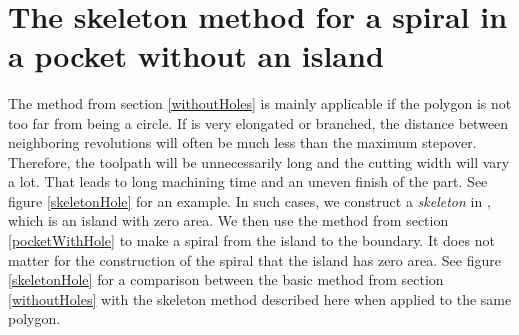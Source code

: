 \documentclass[3p]{elsarticle}
\begin{document}
\begin{figure*}
\centering
{}\\
\quad
{}
\caption{
The same pocket and island as in figure \ref{holeWavefronts}.
The cycle  is blue, the other edges of  are gray.
The interpolated spiral is black, and we have not introduced extra spiral corners on
 to avoid self-intersections.
In order to emphasize the intersection problems that can arise,
we have not used the method described in \ref{appB},
but merely used the preferred time and speed of each node (section \ref{defMovement}).
 is a close-up of 
of the area in the red rectangle. In , we have introduced new corners on
 when the spiral jumps from one side of  to the other when the union of the two
faces on each side of  is not convex.
}
\label{repairCrossings}
\end{figure*}

\section{The skeleton method for a spiral in a pocket without an island}\label{skeletonMethod}

\begin{figure*}
\centering
{}\quad
{}
\caption{
Comparison of the basic spiral method from section \ref{withoutHoles}, figure ,
with the improved skeleton method from section \ref{skeletonMethod}, figure .
Note that the spiral obtained from the skeleton method is significantly shorter and that the distance between
neighboring revolutions is varying much less than when using the basic method.
}
\label{skeletonHole}
\end{figure*}

The method from section \ref{withoutHoles} is mainly applicable
if the polygon  is not too far from being a circle. If  is very elongated or branched,
the distance between neighboring revolutions will often be much less
than the maximum stepover. Therefore, the toolpath will be unnecessarily long and the cutting width will
vary a lot. That leads to long machining time and an uneven finish of the part.
See figure \ref{skeletonHole} for an example.
In such cases, we construct a \emph{skeleton} in ,
which is an island  with zero area.
We then use the method from section \ref{pocketWithHole} to make a spiral from the island to the boundary.
It does not matter for the construction of the spiral that the island  has zero area.
See figure \ref{skeletonHole} for a comparison between the basic method from
section \ref{withoutHoles} with the skeleton method described here when applied to the same
polygon.
\end{document}
